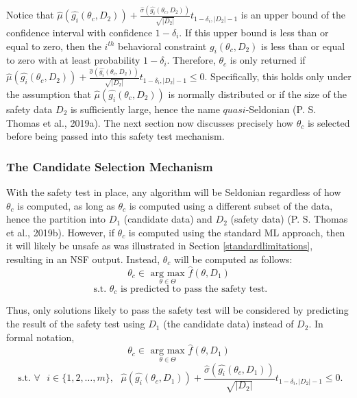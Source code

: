 \documentclass[12pt, twoside]{amherstthesis}
\begin{document}
Notice that \(\hat{\mu}(\hat{g_i}(\theta_c, D_2)) + \frac{\hat{\sigma}(\hat{g_i}(\theta_c, D_2))}{\sqrt{|D_2|}}t_{1-\delta_i, |D_2|-1}\) is an upper bound of the confidence interval with confidence \(1-\delta_i\). If this upper bound is less than or equal to zero, then the \(i^{th}\) behavioral constraint \(g_i(\theta_c, D_2)\) is less than or equal to zero with at least probability \(1-\delta_i\). Therefore, \(\theta_c\) is only returned if \(\hat{\mu}(\hat{g_i}(\theta_c, D_2)) + \frac{\hat{\sigma}(\hat{g_i}(\theta_c, D_2))}{\sqrt{|D_2|}}t_{1-\delta_i, |D_2|-1} \leq 0\). Specifically, this holds only under the assumption that \(\hat{\mu}(\hat{g_i}(\theta_c, D_2))\) is normally distributed or if the size of the safety data \(D_2\) is sufficiently large, hence the name \(\textit{quasi}\)-Seldonian (P. S. Thomas et al., 2019a). The next section now discusses precisely how \(\theta_c\) is selected before being passed into this safety test mechanism.

\hypertarget{candidate}{%
\subsubsection{The Candidate Selection Mechanism}\label{candidate}}

With the safety test in place, any algorithm will be Seldonian regardless of how \(\theta_c\) is computed, as long as \(\theta_c\) is computed using a different subset of the data, hence the partition into \(D_1\) (candidate data) and \(D_2\) (safety data) (P. S. Thomas et al., 2019b). However, if \(\theta_c\) is computed using the standard ML approach, then it will likely be unsafe as was illustrated in Section \ref{standardlimitations}, resulting in an NSF output. Instead, \(\theta_c\) will be computed as follows:
\begin{equation}
\label{ch2eq12}
\theta_c \in \underset{\theta \in \Theta}{\text{ arg max }} \hat{f}(\theta, D_1)
\end{equation}
\[\text{ s.t. } \theta_c \text{ is predicted to pass the safety test}.\]

Thus, only solutions likely to pass the safety test will be considered by predicting the result of the safety test using \(D_1\) (the candidate data) instead of \(D_2\). In formal notation,
\begin{equation}
\label{ch2eq13}
\theta_c \in \underset{\theta \in \Theta}{\text{ arg max }} \hat{f}(\theta, D_1)
\end{equation}
\[ \text{ s.t. } \forall \text{ } i \in \{1,2,\ldots,m\}, \text{  } \hat{\mu}(\hat{g_i}(\theta_c, D_1)) + \frac{\hat{\sigma}(\hat{g_i}(\theta_c, D_1))}{\sqrt{|D_2|}}t_{1-\delta_i, |D_2|-1} \leq 0. \]
\end{document}
